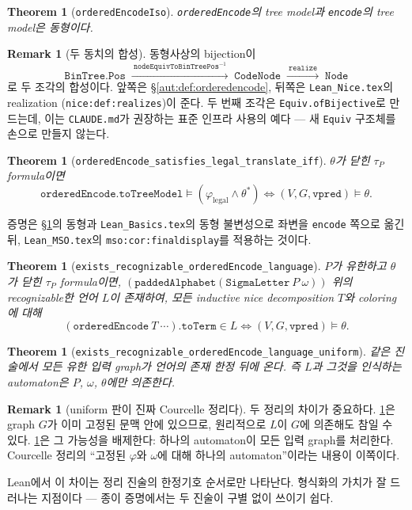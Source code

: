\documentclass[11pt]{article}
\theoremstyle{definition}
\newtheorem{remark}[definition]{Remark}
\theoremstyle{plain}
\newtheorem{theorem}[definition]{Theorem}
\newcommand{\lean}[1]{\texttt{#1}}
\newcommand{\leanfile}[1]{\texttt{#1}}
\begin{document}
\begin{theorem}[\lean{orderedEncodeIso}]
\label{aut:thm:orderedencodeiso}
\lean{orderedEncode}의 tree model과 \lean{encode}의 tree model은 동형이다.
\end{theorem}

\begin{remark}[두 동치의 합성]
동형사상의 bijection이
\[
  \lean{BinTree.Pos} \;\xrightarrow{\ \lean{nodeEquivToBinTreePos}^{-1}\ }\;
  \lean{CodeNode} \;\xrightarrow{\ \lean{realize}\ }\;
  \lean{Node}
\]
로 두 조각의 합성이다. 앞쪽은 \S\ref{aut:def:orderedencode}, 뒤쪽은
\leanfile{Lean\_Nice.tex}의 realization (\lean{nice:def:realizes})이 준다.
두 번째 조각은 \lean{Equiv.ofBijective}로 만드는데, 이는
\leanfile{CLAUDE.md}가 권장하는 표준 인프라 사용의 예다 --- 새 \lean{Equiv}
구조체를 손으로 만들지 않는다.
\end{remark}

\begin{theorem}[\lean{orderedEncode\_satisfies\_legal\_translate\_iff}]
\label{aut:thm:orderedtranslate}
$\theta$가 닫힌 $\tau_P$ formula이면
\[
  \lean{orderedEncode}.\lean{toTreeModel} \models
    (\varphi_{\mathrm{legal}} \land \theta^\ast)
  \iff
  (V, G, \lean{vpred}) \models \theta.
\]
\end{theorem}

증명은 \S\ref{aut:thm:orderedencodeiso}의 동형과
\leanfile{Lean\_Basics.tex}의 동형 불변성으로 좌변을 \lean{encode} 쪽으로
옮긴 뒤, \leanfile{Lean\_MSO.tex}의 \lean{mso:cor:finaldisplay}를 적용하는
것이다.

\begin{theorem}[\lean{exists\_recognizable\_orderedEncode\_language}]
\label{aut:thm:courcellestatement}
$P$가 유한하고 $\theta$가 닫힌 $\tau_P$ formula이면,
$(\lean{paddedAlphabet}(\lean{SigmaLetter}\ P\ \omega))$ 위의 recognizable한
언어 $L$이 존재하여, 모든 inductive nice decomposition $T$와 coloring에 대해
\[
  (\lean{orderedEncode}\ T\ \cdots).\lean{toTerm} \in L
  \iff
  (V, G, \lean{vpred}) \models \theta.
\]
\end{theorem}

\begin{theorem}[\lean{exists\_recognizable\_orderedEncode\_language\_uniform}]
\label{aut:thm:uniform}
같은 진술에서 \emph{모든 유한 입력 graph}가 언어의 존재 한정 \emph{뒤}에
온다. 즉 $L$과 그것을 인식하는 automaton은 $P$, $\omega$, $\theta$에만
의존한다.
\end{theorem}

\begin{remark}[uniform 판이 진짜 Courcelle 정리다]
두 정리의 차이가 중요하다. \ref{aut:thm:courcellestatement}은 graph $G$가 이미
고정된 문맥 안에 있으므로, 원리적으로 $L$이 $G$에 의존해도 참일 수 있다.
\ref{aut:thm:uniform}은 그 가능성을 배제한다: 하나의 automaton이 모든 입력
graph를 처리한다. Courcelle 정리의 ``고정된 $\varphi$와 $\omega$에 대해 하나의
automaton''이라는 내용이 이쪽이다.

Lean에서 이 차이는 정리 진술의 한정기호 순서로만 나타난다. 형식화의
가치가 잘 드러나는 지점이다 --- 종이 증명에서는 두 진술이 구별 없이 쓰이기
쉽다.
\end{remark}
\end{document}
